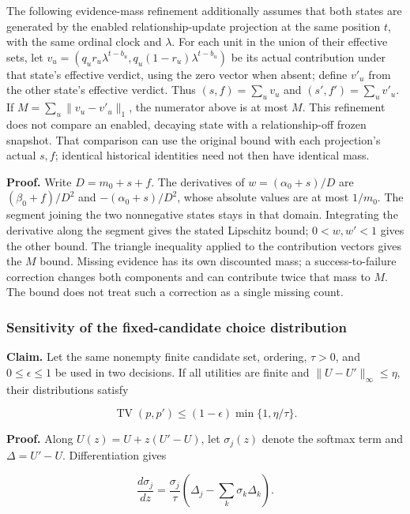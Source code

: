 \documentclass[
  english,
  11pt,
]{article}
\newcounter{none} %
\begin{document}
The following evidence-mass refinement additionally assumes that both
states are generated by the enabled relationship-update projection at
the same position \(t\), with the same ordinal clock and \(\lambda\).
For each unit in the union of their effective sets, let
\(v_u=(q_u r_u\lambda^{t-b_u},q_u(1-r_u)\lambda^{t-b_u})\) be its actual
contribution under that state's effective verdict, using the zero vector
when absent; define \(v'_u\) from the other state's effective verdict.
Thus \((s,f)=\sum_u v_u\) and \((s',f')=\sum_u v'_u\). If
\(M=\sum_u\|v_u-v'_u\|_1\), the numerator above is at most \(M\). This
refinement does not compare an enabled, decaying state with a
relationship-off frozen snapshot. That comparison can use the original
bound with each projection's actual \(s,f\); identical historical
identities need not then have identical mass.

\textbf{Proof.} Write \(D=m_0+s+f\). The derivatives of
\(w=(\alpha_0+s)/D\) are \((\beta_0+f)/D^2\) and \(-(\alpha_0+s)/D^2\),
whose absolute values are at most \(1/m_0\). The segment joining the two
nonnegative states stays in that domain. Integrating the derivative
along the segment gives the stated Lipschitz bound; \(0<w,w'<1\) gives
the other bound. The triangle inequality applied to the contribution
vectors gives the \(M\) bound. Missing evidence has its own discounted
mass; a success-to-failure correction changes both components and can
contribute twice that mass to \(M\). The bound does not treat such a
correction as a single missing count.

\subsubsection{Sensitivity of the fixed-candidate choice
distribution}\label{sensitivity-of-the-fixed-candidate-choice-distribution}

\textbf{Claim.} Let the same nonempty finite candidate set, ordering,
\(\tau>0\), and \(0\leq\epsilon\leq1\) be used in two decisions. If all
utilities are finite and \(\|U-U'\|_\infty\leq\eta\), their
distributions satisfy

\[
\operatorname{TV}(p,p')\leq
(1-\epsilon)\min\{1,\eta/\tau\}.
\]

\textbf{Proof.} Along \(U(z)=U+z(U'-U)\), let \(\sigma_j(z)\) denote the
softmax term and \(\Delta=U'-U\). Differentiation gives

\[
\frac{d\sigma_j}{dz}=
\frac{\sigma_j}{\tau}\left(\Delta_j-
\sum_k\sigma_k\Delta_k\right).
\]
\end{document}
